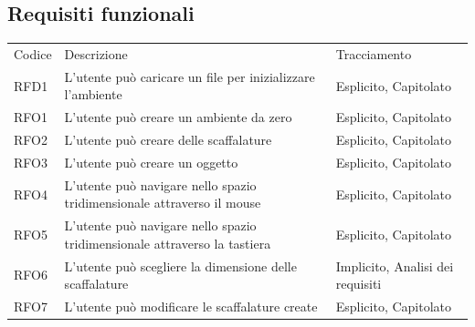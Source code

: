 \subsection{Requisiti funzionali}

\setlength{\arrayrulewidth}{0.5mm}
\renewcommand{\arraystretch}{2.5}

\begin{table}[h]
\centering
{}
\begin{tabular}{ |>{\centering\arraybackslash}p{1cm}|>{\centering\arraybackslash}p{9cm}|>{\centering\arraybackslash}p{5cm}| }
\hline
\multicolumn{3}{|c|}{\Large Requisiti funzionali} \\
\hline
Codice & Descrizione & Tracciamento\\
\hline
RFD1 & L'utente può caricare un file per inizializzare l'ambiente& Esplicito, Capitolato\\
RFO1 & L'utente può creare un ambiente da zero & Esplicito, Capitolato \\
RFO2 & L'utente può creare delle scaffalature & Esplicito, Capitolato\\
RFO3 & L'utente può creare un oggetto & Esplicito, Capitolato\\
RFO4 & L'utente può navigare nello spazio tridimensionale attraverso il mouse& Esplicito, Capitolato\\
RFO5 & L'utente può navigare nello spazio tridimensionale attraverso la tastiera& Esplicito, Capitolato\\
RFO6 & L'utente può scegliere la dimensione delle scaffalature & Implicito, Analisi dei requisiti\\
RFO7 & L'utente può modificare le scaffalature create & Esplicito, Capitolato\\
\hline
\end{tabular}
\end{table}

\newpage

